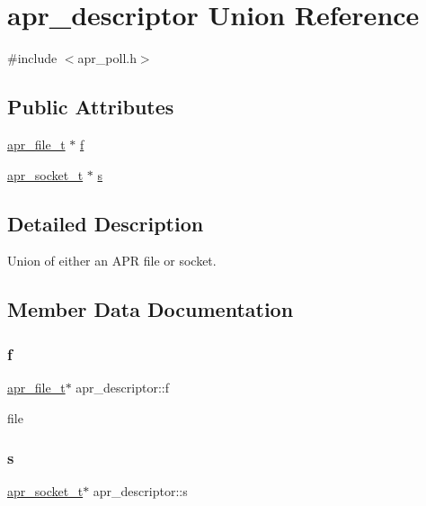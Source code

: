 \hypertarget{unionapr__descriptor}{}\section{apr\+\_\+descriptor Union Reference}
\label{unionapr__descriptor}


{\ttfamily \#include $<$apr\+\_\+poll.\+h$>$}

\subsection*{Public Attributes}
\begin{DoxyCompactItemize}
\item 
\mbox{\hyperlink{structapr__file__t}{apr\+\_\+file\+\_\+t}} $\ast$ \mbox{\hyperlink{unionapr__descriptor_a69d605f2bb33b05ceedb3d95b744ca7e}{f}}
\item 
\mbox{\hyperlink{structapr__socket__t}{apr\+\_\+socket\+\_\+t}} $\ast$ \mbox{\hyperlink{unionapr__descriptor_a39a15be8be084afadfa173810b346f6c}{s}}
\end{DoxyCompactItemize}


\subsection{Detailed Description}
Union of either an A\+PR file or socket. 

\subsection{Member Data Documentation}
\mbox{\label{unionapr__descriptor_a69d605f2bb33b05ceedb3d95b744ca7e}} 
\subsubsection{\texorpdfstring{f}{f}}
{\footnotesize\ttfamily \mbox{\hyperlink{structapr__file__t}{apr\+\_\+file\+\_\+t}}$\ast$ apr\+\_\+descriptor\+::f}

file \mbox{\label{unionapr__descriptor_a39a15be8be084afadfa173810b346f6c}} 
\subsubsection{\texorpdfstring{s}{s}}
{\footnotesize\ttfamily \mbox{\hyperlink{structapr__socket__t}{apr\+\_\+socket\+\_\+t}}$\ast$ apr\+\_\+descriptor\+::s}

